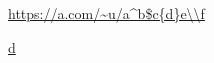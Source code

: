 \documentclass[11pt]{article}
\author{root}
\date{\today}
\title{}
\begin{document}
\tableofcontents

\url{https://a.com/\~u/a\^b\$c\{d\}e\\f}

\href{https://a.com/\~u/a\^b\$c\{d\}e}{d}
\end{document}
